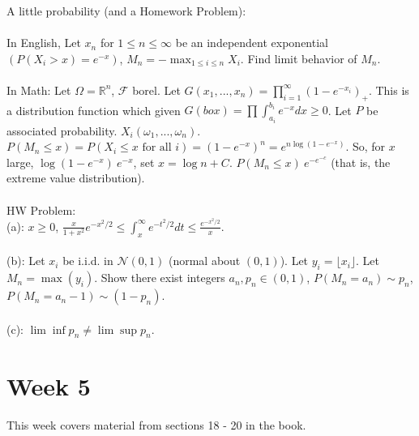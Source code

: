 \documentclass[12pt]{article}
\begin{document}
A little probability (and a Homework Problem):
\\ \\
In English, Let $x_n$ for $1 \le n \le \infty$ be an independent exponential $(P(X_i > x) = e^{-x})$, $M_n = -\max_{1 \le i \le n} X_i$.  Find limit behavior of $M_n$.
\\ \\
In Math: Let $\Omega = \mathbb{R}^n$, $\mathcal{F}$ borel.  Let $G(x_1, ..., x_n) = \prod_{i=1}^\infty (1 - e^{-x_i})_+$.  This is a distribution function which given $G(box) = \prod \int_{a_i}^{b_i} e^{-x} dx \ge 0$.  Let $P$ be associated probability.  $X_i(\omega_1, ..., \omega_n)$.  $P(M_n \le x) = P(X_i \le x \textrm{ for all } i) = (1 - e^{-x})^n = e^{n \log(1 - e^{-x})}$.  So, for $x$ large, $\log(1 - e^{-x}) ~ e^{-x}$, set $x = \log n + C$.  $P(M_n \le x) ~ e^{-e^{-c}}$ (that is, the extreme value distribution).
\\ \\
HW Problem: \\
(a): $x \ge 0$, $\frac{x}{1 + x^2} e^{-x^2/2} \le \int_x^\infty e^{-t^2/2} dt \le \frac{e^{-x^2/2}}{x}$.  \\ \\
(b): Let $x_i$ be i.i.d. in $\mathcal{N}(0,1)$ (normal about $(0,1)$).  Let $y_i = \lfloor x_i \rfloor$.  Let $M_n = \max(y_i)$.  Show there exist integers $a_n, p_n \in (0,1)$, $P(M_n = a_n) \sim p_n$, $P(M_n = a_n - 1) \sim (1 - p_n)$. \\ \\
(c):  $\lim \inf p_n \neq \lim \sup p_n$.

\section{Week 5}
This week covers material from sections 18 - 20 in the book.
\end{document}
